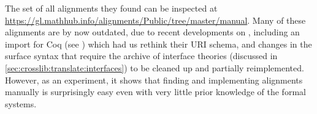 The set of all alignments they found can be inspected at \url{https://gl.mathhub.info/alignments/Public/tree/master/manual}. Many of these alignments are by now outdated, due to recent developments on \mmt, including an import for Coq (see \cite{coqmmt}) which had us rethink their \mmt URI schema, and changes in the surface syntax that require the archive of interface theories (discussed in \autoref{sec:crosslib:translate:interfaces}) to be cleaned up and partially reimplemented. However, as an experiment, it shows that finding and implementing alignments manually is surprisingly easy even with very little prior knowledge of the formal systems.

%

